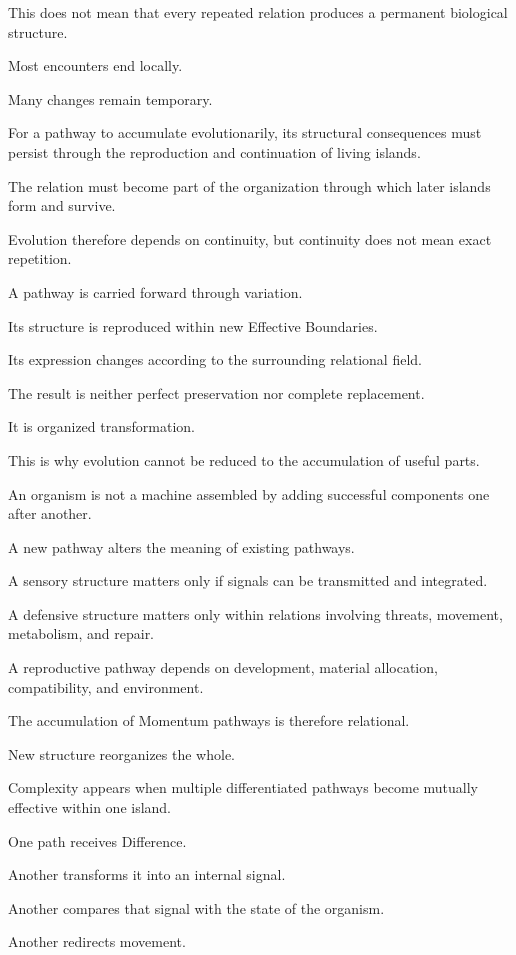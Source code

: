 This does not mean that every repeated relation produces a permanent biological structure.

Most encounters end locally.

Many changes remain temporary.

For a pathway to accumulate evolutionarily, its structural consequences must persist through the reproduction and continuation of living islands.

The relation must become part of the organization through which later islands form and survive.

Evolution therefore depends on continuity, but continuity does not mean exact repetition.

A pathway is carried forward through variation.

Its structure is reproduced within new Effective Boundaries.

Its expression changes according to the surrounding relational field.

The result is neither perfect preservation nor complete replacement.

It is organized transformation.

This is why evolution cannot be reduced to the accumulation of useful parts.

An organism is not a machine assembled by adding successful components one after another.

A new pathway alters the meaning of existing pathways.

A sensory structure matters only if signals can be transmitted and integrated.

A defensive structure matters only within relations involving threats, movement, metabolism, and repair.

A reproductive pathway depends on development, material allocation, compatibility, and environment.

The accumulation of Momentum pathways is therefore relational.

New structure reorganizes the whole.

Complexity appears when multiple differentiated pathways become mutually effective within one island.

One path receives Difference.

Another transforms it into an internal signal.

Another compares that signal with the state of the organism.

Another redirects movement.

